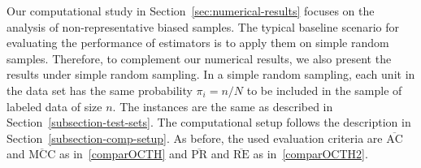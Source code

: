 \documentclass[a4paper,american,reqno]{amsart}
\newcommand{\AC}{\text{AC}}
\newcommand{\PR}{\text{PR}}
\newcommand{\RE}{\text{RE}}
\newcommand{\MCC}{\text{MCC}}
\begin{document}
Our computational study in Section~\ref{sec:numerical-results}
focuses on the analysis of non-representative biased samples.
The typical baseline scenario for evaluating the performance of
estimators is to apply them on simple random samples. Therefore, to
complement our numerical results, we also present the results under
simple random sampling. In a simple random sampling, each
unit in the data set has the same probability $\pi_i = n/N$ to be
included in the sample of labeled data of size $n$.
The instances are the same as described in
Section~\ref{subsection-test-sets}.
The computational setup follows the description in
Section~\ref{subsection-comp-setup}. As before,  the used evaluation
criteria are $\overline{\AC}$ and $\overline{\MCC}$ as
in~\eqref{comparOCTH} and $\overline{\PR}$ and $\overline{\RE}$ as
in~\eqref{comparOCTH2}.
\end{document}
